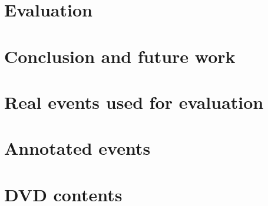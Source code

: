 \documentclass[12pt,twoside]{report}
\begin{document}
\chapter{Evaluation}
\label{chap:evaluation}


\chapter{Conclusion and future work}
\label{chap:conclusion}






\appendix
\chapter{Real events used for evaluation}
\label{app:real-events}


\chapter{Annotated events}
\label{app:clusters-events}


\chapter{DVD contents}

\end{document}
